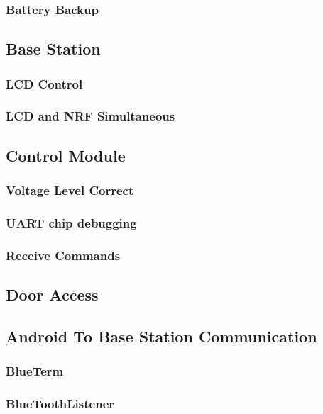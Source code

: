   \subsubsection{Battery Backup}
\lipsum[1]
 \subsection{Base Station}
\lipsum[1]
  \subsubsection{LCD Control}
\lipsum[1]
  \subsubsection{LCD and NRF Simultaneous}
\lipsum[1]
 \subsection{Control Module}
\lipsum[1]
  \subsubsection{Voltage Level Correct}
\lipsum[1]
  \subsubsection{UART chip debugging}
\lipsum[1]
  \subsubsection{Receive Commands}
\lipsum[1]
 \subsection{Door Access}
\lipsum[1]
 \subsection{Android To Base Station Communication}
\lipsum[1]
  \subsubsection{BlueTerm}
\lipsum[1]
  \subsubsection{BlueToothListener}
\lipsum[1]
